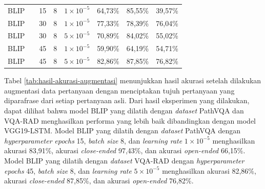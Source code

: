 \begin{table}[H]
{\begin{tabular}{|l|l|r|r|r|r|r|r|}
  BLIP       &                          & 15 & 8 & $1 \times 10^{-5}$ & 64,73\% & 85,55\% & 39,57\% \\ \cline{1-1} \cline{3-8} 
  BLIP       &                          & 30 & 8 & $1 \times 10^{-5}$ & 77,33\% & 78,39\% & 76,04\% \\ \cline{1-1} \cline{3-8} 
  BLIP       &                          & 30 & 8 & $5 \times 10^{-5}$ & 70,89\% & 84,02\% & 55,02\% \\ \cline{1-1} \cline{3-8} 
  BLIP       &                          & 45 & 8 & $1 \times 10^{-5}$ & 59,90\% & 64,19\% & 54,71\% \\ \cline{1-1} \cline{3-8} 
  BLIP       &                          & 45 & 8 & $5 \times 10^{-5}$ & 82,86\% & 87,85\% & 76,82\% \\ \hline
  \end{tabular}%
  }
  \end{table}

\par Tabel \ref{tab:hasil-akurasi-augmentasi} menunjukkan hasil akurasi setelah dilakukan augmentasi data pertanyaan dengan menciptakan tujuh pertanyaan yang diparafrase dari setiap pertanyaan asli. Dari hasil eksperimen yang dilakukan, dapat dilihat bahwa model BLIP yang dilatih dengan \textit{dataset} PathVQA dan VQA-RAD menghasilkan performa yang lebih baik dibandingkan dengan model VGG19-LSTM. Model BLIP yang dilatih dengan \textit{dataset} PathVQA dengan \textit{hyperparameter} \textit{epochs} 15, \textit{batch size} 8, dan \textit{learning rate} $1 \times 10^{-5}$ menghasilkan akurasi 83,91\%, akurasi \textit{close-ended} 97,43\%, dan akurasi \textit{open-ended} 66,15\%. Model BLIP yang dilatih dengan \textit{dataset} VQA-RAD dengan \textit{hyperparameter} \textit{epochs} 45, \textit{batch size} 8, dan \textit{learning rate} $5 \times 10^{-5}$ menghasilkan akurasi 82,86\%, akurasi \textit{close-ended} 87,85\%, dan akurasi \textit{open-ended} 76,82\%.

